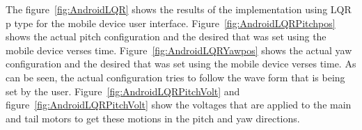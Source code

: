 The figure~\ref{fig:AndroidLQR} shows the results of the implementation using LQR p type for the mobile device user interface.  Figure~\ref{fig:AndroidLQRPitchpos} shows the actual pitch configuration and the desired that was set using the mobile device verses time.  Figure~\ref{fig:AndroidLQRYawpos} shows the actual yaw configuration and the desired that was set using the mobile device verses time.  As can be seen, the actual configuration tries to follow the wave form that is being set by the user.  Figure~\ref{fig:AndroidLQRPitchVolt} and figure~\ref{fig:AndroidLQRPitchVolt} show the voltages that are applied to the main and tail motors to get these motions in the pitch and yaw directions.
\begin{figure}
    \centering
\end{figure}
